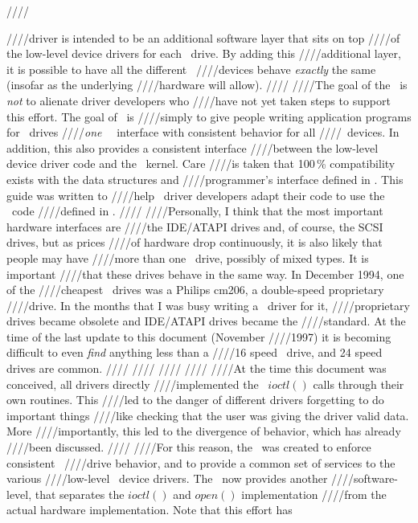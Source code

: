 ////\documentclass{article}
\begin{document}
////driver is intended to be an additional software layer that sits on top
////of the low-level device drivers for each \cdrom\ drive. By adding this
////additional layer, it is possible to have all the different \cdrom\
////devices behave {\em exactly\/} the same (insofar as the underlying
////hardware will allow).
////
////The goal of the \UCD\ is {\em not\/} to alienate driver developers who
////have not yet taken steps to support this effort. The goal of \UCD\ is
////simply to give people writing application programs for \cdrom\ drives
////{\em one\/} \linux\ \cdrom\ interface with consistent behavior for all
////\cdrom\ devices. In addition, this also provides a consistent interface
////between the low-level device driver code and the \linux\ kernel. Care
////is taken that 100\,\% compatibility exists with the data structures and
////programmer's interface defined in \cdromh. This guide was written to
////help \cdrom\ driver developers adapt their code to use the \UCD\ code
////defined in \cdromc.
////
////Personally, I think that the most important hardware interfaces are
////the IDE/ATAPI drives and, of course, the SCSI drives, but as prices
////of hardware drop continuously, it is also likely that people may have
////more than one \cdrom\ drive, possibly of mixed types. It is important
////that these drives behave in the same way. In December 1994, one of the
////cheapest \cdrom\ drives was a Philips cm206, a double-speed proprietary
////drive. In the months that I was busy writing a \linux\ driver for it,
////proprietary drives became obsolete and IDE/ATAPI drives became the
////standard. At the time of the last update to this document (November
////1997) it is becoming difficult to even {\em find} anything less than a
////16 speed \cdrom\ drive, and 24 speed drives are common.
////
////
////\label{cdrom.c}
////
////At the time this document was conceived, all drivers directly
////implemented the \cdrom\ $ioctl()$ calls through their own routines. This
////led to the danger of different drivers forgetting to do important things
////like checking that the user was giving the driver valid data. More
////importantly, this led to the divergence of behavior, which has already
////been discussed.
////
////For this reason, the \UCD\ was created to enforce consistent \cdrom\
////drive behavior, and to provide a common set of services to the various
////low-level \cdrom\ device drivers. The \UCD\ now provides another
////software-level, that separates the $ioctl()$ and $open()$ implementation
////from the actual hardware implementation. Note that this effort has
\end{document}
